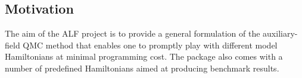 



\subsection{Motivation}

The aim of the ALF project is to provide a general formulation of the auxiliary-field QMC method that enables one to promptly play with different model Hamiltonians at  minimal programming cost. The package also comes with a number of predefined Hamiltonians aimed at producing benchmark results. 

